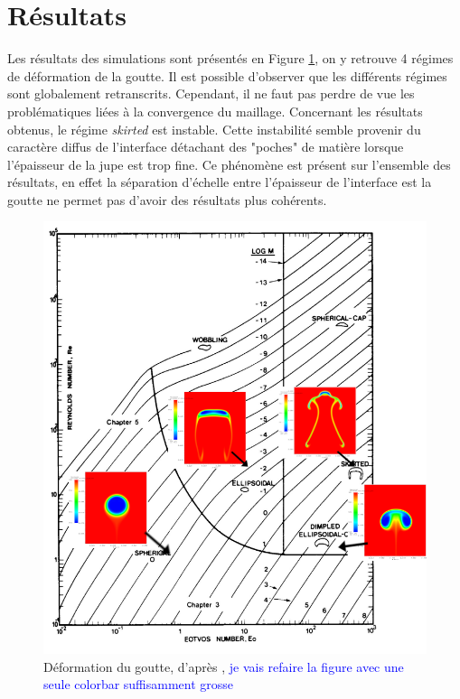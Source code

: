 \section{Résultats}
Les résultats des simulations sont présentés en Figure \ref{fig:abaque}, on y retrouve 4 régimes de déformation de la goutte. Il est possible d'observer que les différents régimes sont globalement retranscrits. Cependant, il ne faut pas perdre de vue les problématiques liées à la convergence du maillage. Concernant les résultats obtenus, le régime \textit{skirted} est instable. Cette instabilité semble provenir du caractère diffus de l'interface détachant des "poches" de matière lorsque l'épaisseur de la jupe est trop fine. Ce phénomène est présent sur l'ensemble des résultats, en effet la séparation d'échelle entre l'épaisseur de l'interface est la goutte ne permet pas d'avoir des résultats plus cohérents.
\begin{figure}[H]
	\centering
	\includegraphics[width=1.0\linewidth]{figure/projet_abaque.png}
	\caption{Déformation du goutte, d'après \cite{clift_bubbles_2005}, \textcolor{blue}{je vais refaire la figure avec une seule colorbar suffisamment grosse}}
	\label{fig:abaque}
\end{figure}




 